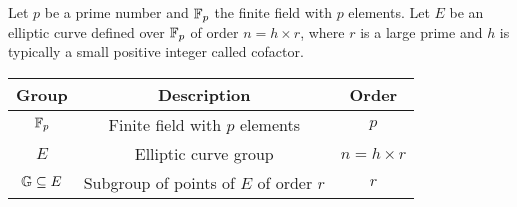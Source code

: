 Let $p$ be a prime number and $\mathbb{F}_p$ the finite field with $p$ elements. Let $E$ be an elliptic curve defined over $\mathbb{F}_p$ of order $n = h\times r$, where $r$ is a large prime and $h$ is typically a small positive integer called cofactor.\\ 

\begin{table}[htp]
	\begin{center}
	\begin{tabular}{c|c|c}
		{\bf Group} & {\bf Description} & {\bf Order} \\
		\hline 
		$\mathbb{F}_p$ & Finite field with $p$ elements & $p$\\
		$E$ & Elliptic curve group & $n = h\times r$\\
		$\mathbb{G} \subseteq E$ & Subgroup of points of $E$ of order $r$ & $r$%
	\end{tabular}
	\end{center}
\end{table}